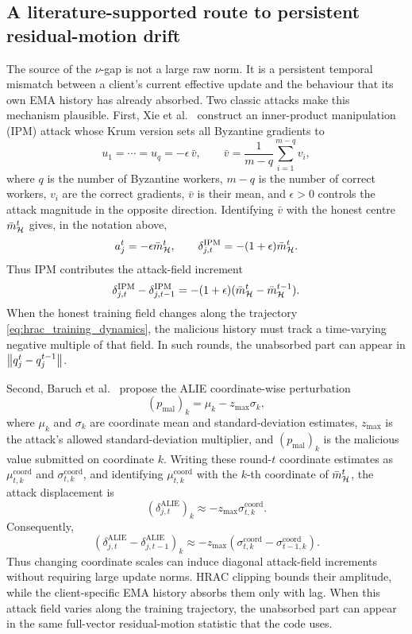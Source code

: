 \subsection{A literature-supported route to persistent residual-motion drift}
\label{subsec:diagonal_d_gap}

The source of the \(\nu\)-gap is not a large raw norm. It is a persistent
temporal mismatch between a client's current effective update and the behaviour
that its own EMA history has already absorbed. Two classic attacks make this
mechanism plausible. First, Xie et al.~\cite{xie2020fall} construct an
inner-product manipulation (IPM) attack whose Krum version sets all Byzantine
gradients to
\[
    u_1=\cdots=u_q=-\epsilon\,\bar v,
    \qquad
    \bar v=\frac1{m-q}\sum_{i=1}^{m-q}v_i,
\]
where \(q\) is the number of Byzantine workers, \(m-q\) is the number of
correct workers, \(v_i\) are the correct gradients, \(\bar v\) is their mean,
and \(\epsilon>0\) controls the attack magnitude in the opposite direction.
Identifying \(\bar v\) with the honest centre \(\bar m_{\mathcal{H}}^t\) gives, in
the notation above,
\[
    a_j^t=-\epsilon\bar m_{\mathcal{H}}^t,
    \qquad
    \delta_{j,t}^{\mathrm{IPM}}=-(1+\epsilon)\bar m_{\mathcal{H}}^t.
\]
Thus IPM contributes the attack-field increment
\[
    \delta_{j,t}^{\mathrm{IPM}}-\delta_{j,t-1}^{\mathrm{IPM}}
    =
    -(1+\epsilon)(\bar m_{\mathcal{H}}^t-\bar m_{\mathcal{H}}^{t-1}).
\]
When the honest training field changes along the trajectory
\eqref{eq:hrac_training_dynamics}, the malicious history must track a
time-varying negative multiple of that field. In such rounds, the unabsorbed
part can appear in \(\left\lVert q_j^t-q_j^{t-1} \right\rVert\).

Second, Baruch et al.~\cite{BarBarGol:19} propose the ALIE coordinate-wise
perturbation
\[
    (p_{\mathrm{mal}})_k=\mu_k-z_{\max}\sigma_k,
\]
where \(\mu_k\) and \(\sigma_k\) are coordinate mean and standard-deviation
estimates, \(z_{\max}\) is the attack's allowed standard-deviation multiplier,
and \((p_{\mathrm{mal}})_k\) is the malicious value submitted on coordinate
\(k\). Writing these round-\(t\) coordinate estimates as
\(\mu_{t,k}^{\mathrm{coord}}\) and \(\sigma_{t,k}^{\mathrm{coord}}\), and
identifying \(\mu_{t,k}^{\mathrm{coord}}\) with the \(k\)-th coordinate of
\(\bar m_{\mathcal{H}}^t\), the attack displacement is
\[
    (\delta_{j,t}^{\mathrm{ALIE}})_k
    \approx
    -z_{\max}\sigma_{t,k}^{\mathrm{coord}}.
\]
Consequently,
\[
    (\delta_{j,t}^{\mathrm{ALIE}}-\delta_{j,t-1}^{\mathrm{ALIE}})_k
    \approx
    -z_{\max}
    (\sigma_{t,k}^{\mathrm{coord}}-\sigma_{t-1,k}^{\mathrm{coord}}).
\]
Thus changing coordinate scales can induce diagonal attack-field increments
without requiring large update norms. HRAC clipping bounds their amplitude,
while the client-specific EMA history absorbs them only with lag. When this
attack field varies along the training trajectory, the unabsorbed part can
appear in the same full-vector residual-motion statistic that the code uses.

